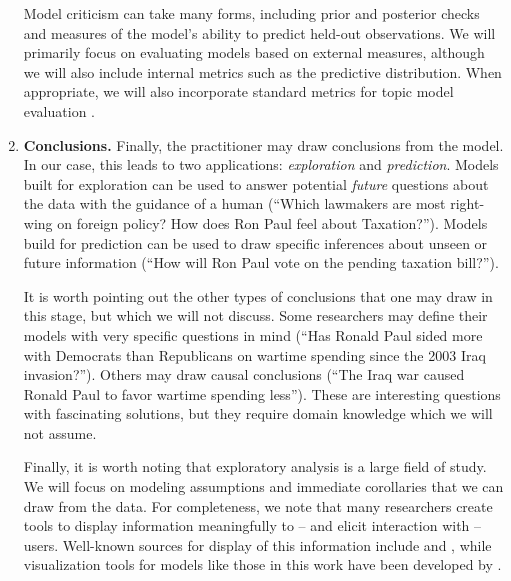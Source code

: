 \begin{enumerate}
    Model criticism can take many forms, including prior and posterior
    checks \citep{box:1980,gelman:1996} and measures of the model's
    ability to predict held-out observations. We will primarily focus
    on evaluating models based on external measures, although we will
    also include internal metrics such as the predictive
    distribution. When appropriate, we will also incorporate standard
    metrics for topic model evaluation \citep{wallach:2009}.
  
  \item \textbf{Conclusions.} Finally, the practitioner may draw
    conclusions from the model.  In our case, this leads to two
    applications: \emph{exploration} and \emph{prediction}.  Models
    built for exploration can be used to answer potential \emph{future}
    questions about the data with the guidance of a human (``Which
    lawmakers are most right-wing on foreign policy?  How does Ron
    Paul feel about Taxation?'').  Models
    build for prediction can be used to draw specific inferences about
    unseen or future information (``How will Ron Paul vote on the
    pending taxation bill?'').

    It is worth pointing out the other types of conclusions that one
    may draw in this stage, but which we will not discuss. Some
    researchers may define their models with very specific questions
    in mind (``Has Ronald Paul sided more with Democrats than
    Republicans on wartime spending since the 2003 Iraq invasion?'').
    Others may draw causal conclusions (``The Iraq war caused Ronald
    Paul to favor wartime spending less''). These are interesting
    questions with fascinating solutions, but they require domain
    knowledge which we will not assume.

    Finally, it is worth noting that exploratory analysis is a large
    field of study.  We will focus on modeling assumptions and
    immediate corollaries that we can draw from the data.  For
    completeness, we note that many researchers create tools to
    display information meaningfully to -- and elicit interaction with
    -- users.  Well-known sources for display of this information
    include \cite{tufte:2001} and \cite{wilkinson:2005}, while
    visualization tools for models like those in this work have been
    developed by \cite{chaney:2012}.

\end{enumerate}

